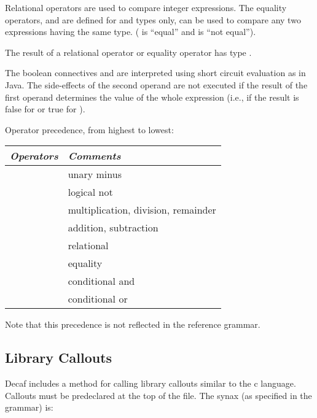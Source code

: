
Relational operators are used to compare integer expressions.  The
equality operators, \term{==} and \term{!=} are defined for 
and  types only, can be used to compare any two
expressions having the same type.  (\term{==} is ``equal'' and
\term{!=} is ``not equal'').

The result of a relational operator or equality operator has type
.

The boolean connectives \term{\&\&} and \term{||} are interpreted using
short circuit evaluation as in Java.  The side-effects of the second
operand are not executed if the result of the first operand determines
the value of the whole expression (i.e., if the result is false for
\term{\&\&} or true for \term{||}).

Operator precedence, from highest to lowest:

\begin{center}
\begin{tabular}{|c|l|}
\hline
{\em Operators\/}  & {\em Comments\/} \\
\hline
\term{-}              & unary minus \\
\term{!}              & logical not \\
\term{* / \%}         & multiplication, division, remainder \\
\term{+ -}            & addition, subtraction \\
\term{<  <=   >=  >}  & relational \\
\term{==  !=}         &  equality \\
\term{\&\&}           & conditional and \\
\term{||}             & conditional or \\ \hline
\end{tabular}
\end{center}

Note that this precedence is not reflected in the reference grammar.

\subsection*{Library Callouts}

Decaf includes a method for calling library callouts similar to the c language. Callouts must be predeclared at the top
of the file. The synax (as specified in the grammar) is:

